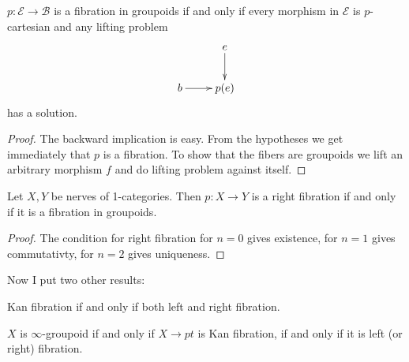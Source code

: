 \begin{lemma}
\label{lemma-fibration-in-groupoids-iff}
$p:\mathcal{E} \to \mathcal{B}$ is a
fibration in groupoids if and only if
every morphism in $\mathcal{E}$ is
$p$-cartesian and any lifting problem
$$
\xymatrix{
& e\ar[d]\\
b\ar[r]& p(e)
}
$$
has a solution.
\end{lemma}

\begin{proof}
The backward implication is easy.
From the hypotheses we get immediately that
$p$ is a fibration.
To show that the fibers are groupoids we lift
an arbitrary morphism $f$
and do lifting problem against itself.
\end{proof}

\begin{definition}
\label{definition-right-fibration-simplicial}

\end{definition}

\begin{lemma}
\label{lemma-fibration-nerves}
Let $X, Y$ be nerves of 1-categories.
Then $p:X \to Y$ is a right fibration if and
only if
it is a fibration in groupoids.
\end{lemma}

\begin{proof}
The condition for right fibration for $n=0$
gives existence,
for $n=1$ gives commutativty,
for $n=2$ gives uniqueness.
\end{proof}

\medskip\noindent
Now I put two other results:

\begin{lemma}
\label{lemma-kan-fibration-left-right}
Kan fibration if and only if both left and
right fibration.
\end{lemma}

\begin{lemma}
\label{lemma-kan-fibration-infty-groupoids}
$X$ is $\infty$-groupoid if and only if $X
\to pt$ is Kan fibration,
if and only if it is left (or right)
fibration.
\end{lemma}













